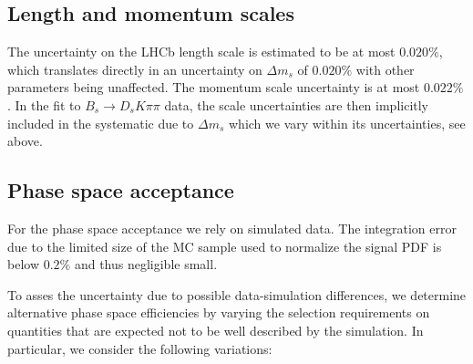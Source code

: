 \subsection{Length and momentum scales}
The uncertainty on the LHCb length scale is estimated to be at most $0.020\%$\cite{LHCb-ANA-2012-053,LHCb-PAPER-2013-006}, which translates
directly in an uncertainty on $\Delta m_s$ of $0.020\%$ with other parameters being unaffected.
The momentum scale uncertainty is at most $0.022\%$.
In the fit to  $B_s \to D_s K \pi\pi$ data, the scale uncertainties are then implicitly included in the systematic due to $\Delta m_s$ which we 
vary within its uncertainties, see above.

\subsection{Phase space acceptance}
\label{sec:SysPhspAcc}

For the phase space acceptance we rely on simulated data.
The integration error due to the limited size of the MC sample 
used to normalize the signal PDF is below $0.2\%$ and thus negligible small.

To asses the uncertainty due to possible data-simulation differences, we determine
alternative phase space efficiencies by varying the selection requirements on quantities that
are expected not to be well described by the simulation. 
In particular, we consider the following variations:

